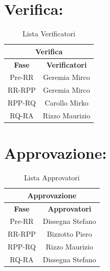 	
\section*{\LARGE Verifica:}
\begin{table}[!h]
	\begin{center}
		\begin{tabular}
			{|c|c|}
			\hline
			\multicolumn{2}{|c|}{ \textbf{Verifica} } \\
			\hline
			\textbf{Fase} & \textbf{Verificatori} \\
			\hline
			Pre-RR & Geremia Mirco \\
			\hline
			RR-RPP & Geremia Mirco\\
			\hline
			RPP-RQ & Carollo Mirko \\									
			\hline
			RQ-RA & Rizzo Maurizio \\
			\hline

		\end{tabular}
		\caption{Lista Verificatori} %
		\label{tabverifica}
	\end{center}
\end{table}	
	
\section*{\LARGE Approvazione:}
\begin{table}[!h]
	\begin{center}
		\begin{tabular}
			{|c|c|}
			\hline
			\multicolumn{2}{|c|}{ \textbf{Approvazione} } \\
			\hline
			\textbf{Fase} & \textbf{Approvatori} \\
			\hline
			Pre-RR & Dissegna Stefano \\
			\hline
			RR-RPP & Bizzotto Piero\\
			\hline
			RPP-RQ & Rizzo Maurizio \\
			\hline
			RQ-RA & Dissegna Stefano \\
			\hline

		\end{tabular}
		\caption{Lista Approvatori} %
		\label{tabapprovazione}
	\end{center}
\end{table}

